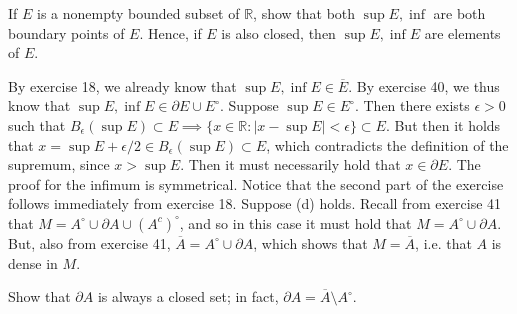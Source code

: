 \begin{exercise}{42}
    If $E$ is a nonempty bounded subset of $\mathbb{R}$, show that both $\sup E, \inf $ are both boundary points of $E$.
    Hence, if $E$ is also closed, then $\sup E, \inf E$ are elements of $E$.
\end{exercise}

\begin{solution}
    
    By exercise 18, we already know that $\sup E, \inf E \in \overline{E}$.
    By exercise 40, we thus know that $\sup E, \inf E \in \partial E \cup E^\circ$.
    Suppose $\sup E \in E^\circ$.
    Then there exists $\epsilon > 0$ such that $B_{\epsilon}(\sup E) \subset E \implies \{x \in \mathbb{R}: \lvert x - \sup E \rvert < \epsilon\} \subset E$.
    But then it holds that $x = \sup E + \epsilon/2 \in B_{\epsilon}(\sup E) \subset E$, which contradicts the definition of the supremum, since $x > \sup E$.
    Then it must necessarily hold that $x \in \partial E$.
    The proof for the infimum is symmetrical.
    Notice that the second part of the exercise follows immediately from exercise 18.
    Suppose (d) holds.
    Recall from exercise 41 that $M = A^\circ \cup \partial A \cup (A^c)^\circ$, and so in this case it must hold that $M = A^\circ \cup \partial A$.
    But, also from exercise 41, $\overline{A} = A^\circ \cup \partial A$, which shows that $M = \overline{A}$, i.e. that $A$ is dense in $M$.
\end{solution}

\begin{exercise}{43}
    Show that $\partial A$ is always a closed set; in fact, $\partial A = \overline{A} \setminus A^\circ$.
\end{exercise}

